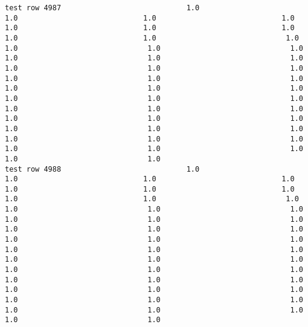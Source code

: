 \documentclass[11pt]{article}
\begin{document}
\begin{verbatim}
test row 4987                             1.0                             1.0                             1.0                             1.0                             1.0                             1.0                             1.0                             1.0                             1.0                              1.0                              1.0                              1.0                              1.0                              1.0                              1.0                              1.0                              1.0                              1.0                              1.0                              1.0                              1.0                              1.0                              1.0                              1.0                              1.0                              1.0                              1.0                              1.0                              1.0                              1.0                              1.0                              1.0                              1.0                              1.0                              1.0                              1.0                              1.0                              1.0                              1.0                              1.0                              1.0                              1.0                              1.0                              1.0                              1.0
test row 4988                             1.0                             1.0                             1.0                             1.0                             1.0                             1.0                             1.0                             1.0                             1.0                              1.0                              1.0                              1.0                              1.0                              1.0                              1.0                              1.0                              1.0                              1.0                              1.0                              1.0                              1.0                              1.0                              1.0                              1.0                              1.0                              1.0                              1.0                              1.0                              1.0                              1.0                              1.0                              1.0                              1.0                              1.0                              1.0                              1.0                              1.0                              1.0                              1.0                              1.0                              1.0                              1.0                              1.0                              1.0                              1.0

\end{verbatim}
\end{document}
